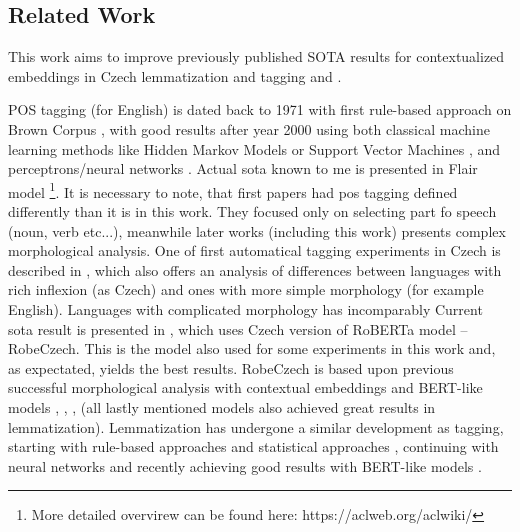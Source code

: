 \subsection{Related Work}
This work aims to improve previously published SOTA results for contextualized embeddings in Czech lemmatization and tagging \citep{straka2019czech} and \citep{Straka2021}.

POS tagging (for English) is dated back to 1971 with first rule-based approach on Brown Corpus \citep{greene1971automatic}, with good results after year 2000 using both classical machine learning methods like Hidden Markov Models \citep{tnt} or Support Vector Machines \citep{svmtool}, and perceptrons/neural networks  \citep{collins-2002-discriminative}. Actual \acrlong{sota} known to me is presented in Flair model \citep{Akbik2018}\footnote{More detailed overvirew can be found here: https://aclweb.org/aclwiki/}. It is necessary to note, that first papers had \acrshort{pos} tagging defined differently than it is in this work. They focused only on selecting part fo speech (noun, verb etc...), meanwhile later works (including this work) presents  complex morphological analysis. %
One of first automatical tagging experiments in Czech is described in \citep{Hladka}, which also offers an analysis of differences between languages with rich inflexion (as Czech) and ones with more simple morphology (for example English). Languages with complicated morphology has incomparably   Current \acrshort{sota} result is presented in \citep{Straka2021}, which uses Czech version of RoBERTa model -- RobeCzech. This is the model also used for some experiments in this work and, as expectated,  yields the best results. RobeCzech is based upon previous successful morphological analysis with contextual embeddings and BERT-like models \citep{Straka2019b}, \citep{Straka2019a}, \citep{Straka2019}, \citep{Straka2018} (all lastly mentioned models also achieved great results in lemmatization). %
Lemmatization has undergone a similar development as tagging, starting with rule-based approaches and statistical approaches \citep{Plisson}, continuing with neural networks and recently achieving good results with BERT-like models \citep{Kondratyuk2019}.





